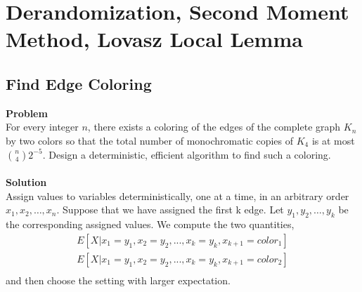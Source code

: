 \chapter{Derandomization, Second Moment Method,
	Lovasz Local Lemma}

	\section{Find Edge Coloring}
	\textbf{Problem}\\
	For every integer $n$, there exists a coloring of the edges of the complete graph $K_n$ by two colors so that the total number of monochromatic copies of $K_4$ is at most $\binom{n}{4}2^{-5}$. Design a deterministic, efficient algorithm to find such a coloring.\\\\
	\textbf{Solution}\\
		Assign values to variables deterministically, one at a time, in an arbitrary order
		$x_1, x_2, \dots , x_n$. Suppose that we have assigned the first k edge. Let $y_1, y_2, \dots , y_k$
		be the corresponding assigned values. We compute the two quantities,
		\begin{equation*}
			\begin{split}
				E[X | x_1 = y_1, x_2 = y_2, . . . , x_k = y_k, x_{k+1} = color_1 ]\\
				E[X | x_1 = y_1, x_2 = y_2, . . . , x_k = y_k, x_{k+1} = color_2 ]\\
			\end{split}
		\end{equation*}
		and then choose the setting with larger expectation.
	
